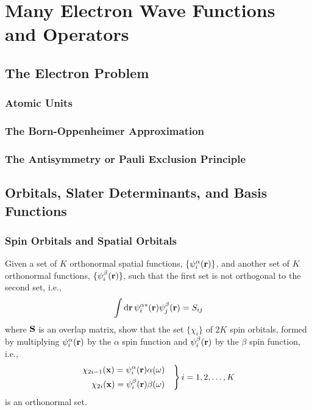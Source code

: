 \documentclass[a4paper]{book}
\newcounter{exercise}[chapter]
\newcommand*{\dif}{\mathop{}\!\mathrm{d}}
\newcommand{\bfr}{{\bf r}}
\newcommand{\bfx}{{\bf x}}
\begin{document}

	\chapter{Many Electron Wave Functions and Operators}
	
	\section{The Electron Problem}
	
	\subsection{Atomic Units}
	
	\subsection{The Born-Oppenheimer Approximation}
	
	\subsection{The Antisymmetry or Pauli Exclusion Principle}
	
	\section{Orbitals, Slater Determinants, and Basis Functions}
	
	\subsection{Spin Orbitals and Spatial Orbitals}
	
	\begin{exercise}
	Given a set of $K$ orthonormal spatial functions, $\{\psi^\alpha_i(\bfr)\}$, and another set of $K$ orthonormal functions, $\{\psi^\beta_i(\bfr)\}$, such that the first set is not orthogonal to the second set, i.e., 
	\[
		\int \dif \bfr \, \psi^{\alpha*}_i( \bfr ) \psi^\beta_j( \bfr ) = S_{ij}
	\]
	where ${\bf S}$ is an overlap matrix, show that the set $\{ \chi_i \}$ of $2K$ spin orbitals, formed by multiplying $\psi^\alpha_i( \bfr )$ by the $\alpha$ spin function and $\psi^\beta_i( \bfr )$ by the $\beta$ spin function, i.e.,
	\[ \left.
	\begin{rgathered}
		\chi_{2i-1}(\bfx) = \psi^\alpha_i( \bfr ) \alpha( \omega ) \quad \\
		\chi_{2i}(\bfx) = \psi^\beta_i( \bfr ) \beta( \omega ) \quad
	\end{rgathered} \right\} i = 1, 2, \ldots, K
	\]
	is an orthonormal set.
	\end{exercise}
	
\end{document}
